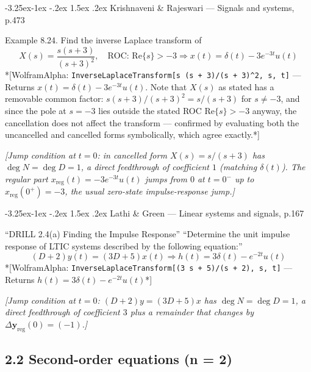 \documentclass[
  11pt,
]{article}
\makeatletter
\providecommand{\implies}{\Longrightarrow}
\renewcommand\paragraph{\@startsection{paragraph}{4}{\z@}%
                                     {-3.25ex\@plus -1ex \@minus -.2ex}%
                                     {1.5ex \@plus .2ex}%
                                     {\normalfont\normalsize\bfseries}}
\makeatother
\begin{document}
\hypertarget{krishnaveni-rajeswari-signals-and-systems-p.473}{%
\paragraph{Krishnaveni \& Rajeswari --- Signals and systems,
p.473}\label{krishnaveni-rajeswari-signals-and-systems-p.473}}

Example 8.24. Find the inverse Laplace transform of \[
X(s) = \frac{s(s+3)}{(s+3)^2}, \quad \text{ROC: } \text{Re}\{s\} > -3 \implies x(t) = \delta(t) - 3e^{-3t}u(t)
\] *{[}WolframAlpha:
\texttt{InverseLaplaceTransform{[}s\ (s\ +\ 3)/(s\ +\ 3)\^{}2,\ s,\ t{]}}
--- Returns \(x(t) = \delta(t) - 3e^{-3t}u(t)\). Note that \(X(s)\) as
stated has a removable common factor: \(s(s+3)/(s+3)^2 = s/(s+3)\) for
\(s\neq -3\), and since the pole at \(s=-3\) lies outside the stated ROC
\(\text{Re}\{s\}>-3\) anyway, the cancellation does not affect the
transform --- confirmed by evaluating both the uncancelled and cancelled
forms symbolically, which agree exactly.*{]}

\emph{{[}Jump condition at \(t=0\): in cancelled form \(X(s)=s/(s+3)\)
has \(\deg N=\deg D=1\), a direct feedthrough of coefficient \(1\)
(matching \(\delta(t)\)). The regular part
\(x_{\text{reg}}(t)=-3e^{-3t}u(t)\) jumps from \(0\) at \(t=0^-\) up to
\(x_{\text{reg}}(0^+)=-3\), the usual zero-state impulse-response
jump.{]}}

\hypertarget{lathi-green-linear-systems-and-signals-p.167}{%
\paragraph{Lathi \& Green --- Linear systems and signals,
p.167}\label{lathi-green-linear-systems-and-signals-p.167}}

``DRILL 2.4(a) Finding the Impulse Response'' ``Determine the unit
impulse response of LTIC systems described by the following equation:''
\[ (D + 2)y(t) = (3D + 5)x(t) \implies h(t)=3\delta(t) - e^{-2t}u(t) \]
*{[}WolframAlpha:
\texttt{InverseLaplaceTransform{[}(3\ s\ +\ 5)/(s\ +\ 2),\ s,\ t{]}} ---
Returns \(h(t) = 3\delta(t) - e^{-2t} u(t)\)*{]}

\emph{{[}Jump condition at \(t=0\): \((D+2)y=(3D+5)x\) has
\(\deg N=\deg D=1\), a direct feedthrough of coefficient \(3\) plus a
remainder that changes by \(\Delta\mathbf y_{\text{reg}}(0)=(-1)\).{]}}

\hypertarget{second-order-equations}{%
\subsection{2.2 Second-order equations (n =
2)}\label{second-order-equations}}
\end{document}
